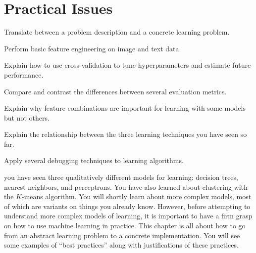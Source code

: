 \chapter{Practical Issues} \label{sec:prac}



\begin{learningobjectives}
\item Translate between a problem description and a concrete learning
  problem.
\item Perform basic feature engineering on image and text data.
\item Explain how to use cross-validation to tune hyperparameters and
  estimate future performance.
\item Compare and contrast the differences between several evaluation
  metrics.
\item Explain why feature combinations are important for learning with
  some models but not others.
\item Explain the relationship between the three learning techniques
  you have seen so far.
\item Apply several debugging techniques to learning algorithms.
\end{learningobjectives}


 you have seen three qualitatively
different models for learning: decision trees, nearest neighbors, and
perceptrons.  You have also learned about clustering with the
$K$-means algorithm.  You will shortly learn about more complex
models, most of which are variants on things you already know.
However, before attempting to understand more complex models of
learning, it is important to have a firm grasp on how to use machine
learning in practice.  This chapter is all about how to go from an
abstract learning problem to a concrete implementation.  You will see
some examples of ``best practices'' along with justifications of these
practices.

